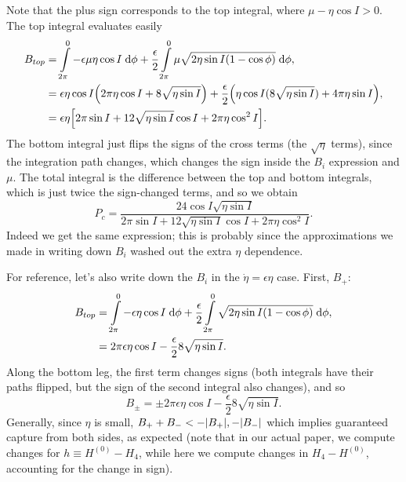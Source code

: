 \documentclass[11pt,
        usenames, %
        dvipsnames %
    ]{article}
\DeclarePairedDelimiter\abs{\lvert}{\rvert}
\DeclarePairedDelimiter\p{\lparen}{\rparen}
\DeclarePairedDelimiter\s{\lbrack}{\rbrack}
\begin{document}
Note that the plus sign corresponds to the top integral, where $\mu - \eta \cos
I > 0$. The top integral evaluates easily
\begin{align*}
    B_{top} &= \int\limits_{2\pi}^0 -\epsilon \mu \eta \cos I\;\mathrm{d}\phi
            + \frac{\epsilon}{2}\int\limits_{2\pi}^0
                \mu\sqrt{2\eta \sin I\p*{1 - \cos \phi}}\;\mathrm{d}\phi,\\
        &= \epsilon \eta \cos I\p*{2\pi \eta \cos I + 8\sqrt{\eta \sin I}}
            + \frac{\epsilon}{2}\p*{\eta \cos I (8\sqrt{\eta \sin I})
            + 4\pi \eta \sin I},\\
        &= \epsilon \eta \s*{
            2\pi \sin I + 12\sqrt{\eta \sin I}\cos I + 2\pi \eta \cos^2 I}.
\end{align*}
The bottom integral just flips the signs of the cross terms (the $\sqrt{\eta}$
terms), since the integration path changes, which changes the sign inside the
$B_i$ expression and $\mu$. The total integral is the difference between the top
and bottom integrals, which is just twice the sign-changed terms, and so we
obtain
\begin{equation}
    P_c = \frac{24\cos I \sqrt{\eta \sin I}}{
            2\pi \sin I + 12\sqrt{\eta \sin I}\cos I + 2\pi \eta \cos^2 I}.
\end{equation}
Indeed we get the same expression; this is probably since the approximations we
made in writing down $B_i$ washed out the extra $\eta$ dependence.

For reference, let's also write down the $B_i$ in the $\dot{\eta} = \epsilon
\eta$ case. First, $B_{+}$:
\begin{align*}
    B_{top} &= \int\limits_{2\pi}^0 -\epsilon \eta \cos I\;\mathrm{d}\phi
            + \frac{\epsilon}{2}\int\limits_{2\pi}^0
                \sqrt{2\eta \sin I\p*{1 - \cos \phi}}\;\mathrm{d}\phi,\\
        &= 2\pi \epsilon \eta \cos I - \frac{\epsilon}{2}8\sqrt{\eta \sin I}.
\end{align*}
Along the bottom leg, the first term changes signs (both integrals have their
paths flipped, but the sign of the second integral also changes), and so
\begin{equation}
    B_{\pm} = \pm 2\pi \epsilon \eta \cos I
        - \frac{\epsilon}{2}8\sqrt{\eta \sin I}.
\end{equation}
Generally, since $\eta$ is small, $B_{+} + B_- < -\abs*{B_+}, -\abs*{B_-}$ which
implies guaranteed capture from both sides, as expected (note that in our actual
paper, we compute changes for $h \equiv H^{(0)} - H_4$, while here we compute
changes in $H_4 - H^{(0)}$, accounting for the change in sign).
\end{document}
